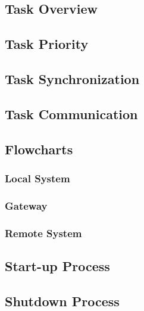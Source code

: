 \subsection{Task Overview}

\subsection{Task Priority}

\subsection{Task Synchronization}

\subsection{Task Communication}

\subsection{Flowcharts}
\subsubsection{Local System}
\subsubsection{Gateway}
\subsubsection{Remote System}

\subsection{Start-up Process}

\subsection{Shutdown Process}

